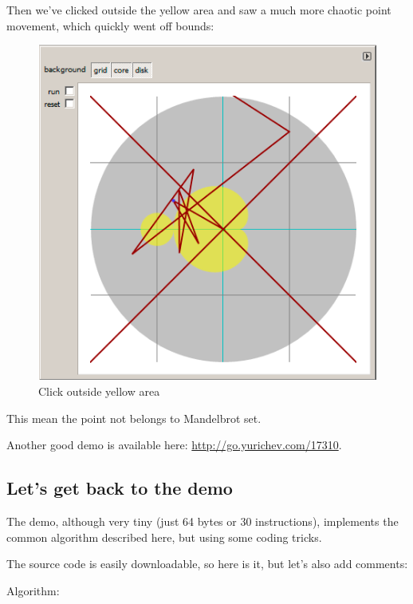 Then we've clicked outside the yellow area and saw a much more chaotic point movement, 
which quickly went off bounds:

\begin{figure}[H]
\centering
\includegraphics[scale=\FigScale]{examples/demos/mandelbrot/demo2.png}
\caption{Click outside yellow area}
\end{figure}

This mean the point not belongs 
to Mandelbrot set.

Another good demo is available here: 
\url{http://go.yurichev.com/17310}.

\clearpage
\subsection{Let's get back to the demo}


The demo, although very tiny (just 64 bytes or 30 instructions), implements the common algorithm 
described here, but using some coding tricks.

%
The source code is easily downloadable, so here is it, but let's also add comments:



Algorithm:

